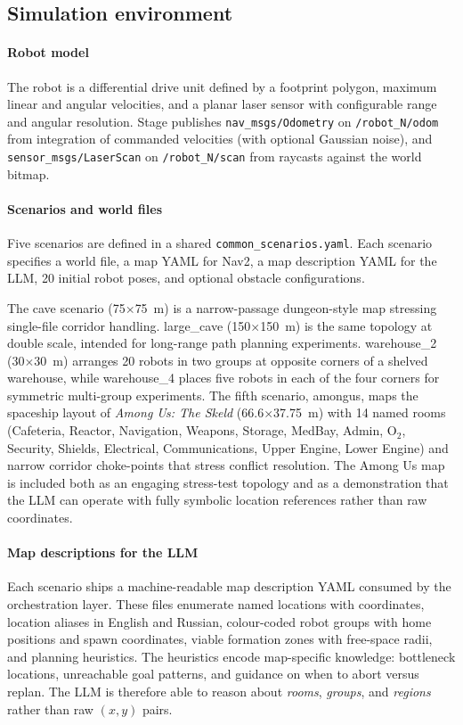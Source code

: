 \documentclass[conference]{IEEEtran}
\begin{document}
\subsection{Simulation environment}

\paragraph{Robot model} The robot is a differential drive unit
defined by a footprint polygon, maximum linear and angular
velocities, and a planar laser sensor with configurable range
and angular resolution. Stage publishes
\texttt{nav\_msgs/Odometry} on \texttt{/robot\_N/odom} from
integration of commanded velocities (with optional Gaussian
noise), and \texttt{sensor\_msgs/LaserScan} on
\texttt{/robot\_N/scan} from raycasts against the world bitmap.

\paragraph{Scenarios and world files}
Five scenarios are defined in a shared
\texttt{common\_scenarios.yaml}. Each scenario specifies a
world file, a map YAML for Nav2, a map description YAML for the
LLM, 20 initial robot poses, and optional obstacle
configurations.

The \textsf{cave} scenario (75$\times$75~m) is a
narrow-passage dungeon-style map stressing single-file corridor
handling. \textsf{large\_cave} (150$\times$150~m) is the same
topology at double scale, intended for long-range path planning
experiments. \textsf{warehouse\_2} (30$\times$30~m) arranges
20 robots in two groups at opposite corners of a shelved
warehouse, while \textsf{warehouse\_4} places five robots in
each of the four corners for symmetric multi-group experiments.
The fifth scenario, \textsf{amongus}, maps the spaceship layout
of \emph{Among Us: The Skeld} (66.6$\times$37.75~m) with 14
named rooms (Cafeteria, Reactor, Navigation, Weapons, Storage,
MedBay, Admin, O$_2$, Security, Shields, Electrical,
Communications, Upper Engine, Lower Engine) and narrow corridor
choke-points that stress conflict resolution. The Among Us map
is included both as an engaging stress-test topology and as a
demonstration that the LLM can operate with fully symbolic
location references rather than raw coordinates.

\paragraph{Map descriptions for the LLM}
Each scenario ships a machine-readable map description YAML
consumed by the orchestration layer. These files enumerate
named locations with coordinates, location aliases in English
and Russian, colour-coded robot groups with home positions and
spawn coordinates, viable formation zones with free-space
radii, and planning heuristics. The heuristics encode
map-specific knowledge: bottleneck locations, unreachable goal
patterns, and guidance on when to abort versus replan. The LLM
is therefore able to reason about \emph{rooms}, \emph{groups},
and \emph{regions} rather than raw $(x,y)$ pairs.
\end{document}

